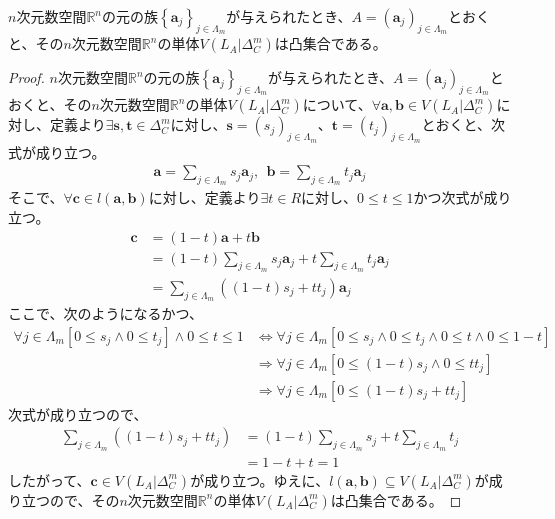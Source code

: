 \documentclass[dvipdfmx]{jsarticle}
\begin{document}
\begin{thm}\label{8.2.2.27}
$n$次元数空間$\mathbb{R}^{n}$の元の族$\left\{ \mathbf{a}_{j} \right\}_{j \in \varLambda_{m}}$が与えられたとき、$A = \left( \mathbf{a}_{j} \right)_{j \in \varLambda_{m}}$とおくと、その$n$次元数空間$\mathbb{R}^{n}$の単体$V\left( L_{A}|\varDelta_{C}^{m} \right)$は凸集合である。
\end{thm}
\begin{proof}
$n$次元数空間$\mathbb{R}^{n}$の元の族$\left\{ \mathbf{a}_{j} \right\}_{j \in \varLambda_{m}}$が与えられたとき、$A = \left( \mathbf{a}_{j} \right)_{j \in \varLambda_{m}}$とおくと、その$n$次元数空間$\mathbb{R}^{n}$の単体$V\left( L_{A}|\varDelta_{C}^{m} \right)$について、$\forall\mathbf{a},\mathbf{b} \in V\left( L_{A}|\varDelta_{C}^{m} \right)$に対し、定義より$\exists\mathbf{s},\mathbf{t} \in \varDelta_{C}^{m}$に対し、$\mathbf{s} = \left( s_{j} \right)_{j \in \varLambda_{m}}$、$\mathbf{t} = \left( t_{j} \right)_{j \in \varLambda_{m}}$とおくと、次式が成り立つ。
\begin{align*}
\mathbf{a} = \sum_{j \in \varLambda_{m}} {s_{j}\mathbf{a}_{j}},\ \ \mathbf{b} = \sum_{j \in \varLambda_{m}} {t_{j}\mathbf{a}_{j}}
\end{align*}
そこで、$\forall\mathbf{c} \in l\left( \mathbf{a},\mathbf{b} \right)$に対し、定義より$\exists t \in R$に対し、$0 \leq t \leq 1$かつ次式が成り立つ。
\begin{align*}
\mathbf{c} &= (1 - t)\mathbf{a} + t\mathbf{b}\\
&= (1 - t)\sum_{j \in \varLambda_{m}} {s_{j}\mathbf{a}_{j}} + t\sum_{j \in \varLambda_{m}} {t_{j}\mathbf{a}_{j}}\\
&= \sum_{j \in \varLambda_{m}} {\left( (1 - t)s_{j} + tt_{j} \right)\mathbf{a}_{j}}
\end{align*}
ここで、次のようになるかつ、
\begin{align*}
\forall j \in \varLambda_{m}\left[ 0 \leq s_{j} \land 0 \leq t_{j} \right] \land 0 \leq t \leq 1 &\Leftrightarrow \forall j \in \varLambda_{m}\left[ 0 \leq s_{j} \land 0 \leq t_{j} \land 0 \leq t \land 0 \leq 1 - t \right]\\
&\Rightarrow \forall j \in \varLambda_{m}\left[ 0 \leq (1 - t)s_{j} \land 0 \leq tt_{j} \right]\\
&\Rightarrow \forall j \in \varLambda_{m}\left[ 0 \leq (1 - t)s_{j} + tt_{j} \right]
\end{align*}
次式が成り立つので、
\begin{align*}
\sum_{j \in \varLambda_{m}} \left( (1 - t)s_{j} + tt_{j} \right) &= (1 - t)\sum_{j \in \varLambda_{m}} s_{j} + t\sum_{j \in \varLambda_{m}} t_{j}\\
&= 1 - t + t = 1
\end{align*}
したがって、$\mathbf{c} \in V\left( L_{A}|\varDelta_{C}^{m} \right)$が成り立つ。ゆえに、$l\left( \mathbf{a},\mathbf{b} \right) \subseteq V\left( L_{A}|\varDelta_{C}^{m} \right)$が成り立つので、その$n$次元数空間$\mathbb{R}^{n}$の単体$V\left( L_{A}|\varDelta_{C}^{m} \right)$は凸集合である。
\end{proof}
\end{document}
